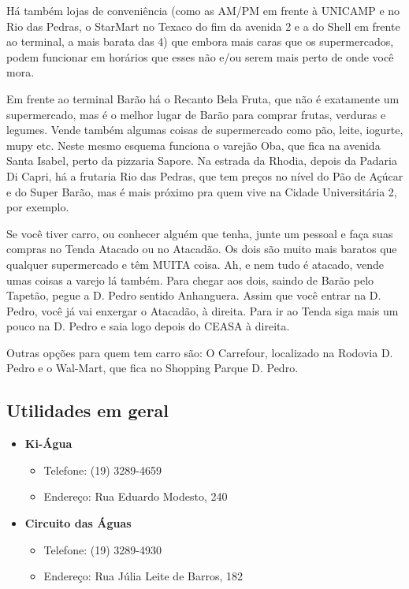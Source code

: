 \documentclass[a4paper,10pt]{article}
\begin{document}
Há também lojas de conveniência (como as AM/PM em frente à UNICAMP e no Rio das
Pedras, o StarMart no Texaco do fim da avenida 2 e a do Shell em frente ao
terminal, a mais barata das 4) que embora mais caras que os supermercados, podem
funcionar em horários que esses não e/ou serem mais perto de onde você mora.

Em frente ao terminal Barão há o Recanto Bela Fruta, que não é exatamente um
supermercado, mas é o melhor lugar de Barão para comprar frutas, verduras
e legumes. Vende também algumas coisas de supermercado como pão, leite, iogurte,
mupy etc. Neste mesmo esquema funciona o varejão Oba, que fica na avenida Santa
Isabel, perto da pizzaria Sapore. Na estrada da Rhodia, depois da Padaria Di
Capri, há a frutaria Rio das Pedras, que tem preços no nível do Pão de Açúcar
e do Super Barão, mas é mais próximo pra quem vive na Cidade Universitária 2,
por exemplo.

Se você tiver carro, ou conhecer alguém que tenha, junte um pessoal e faça suas
compras no Tenda Atacado ou no Atacadão. Os dois são muito mais baratos que
qualquer supermercado e têm MUITA coisa. Ah, e nem tudo é atacado, vende umas
coisas a varejo lá também. Para chegar aos dois, saindo de Barão pelo Tapetão,
pegue a D. Pedro sentido Anhanguera. Assim que você entrar na D. Pedro, você já
vai enxergar o Atacadão, à direita. Para ir ao Tenda siga mais um pouco na D.
Pedro e saia logo depois do CEASA à direita.

Outras opções para quem tem carro são: O Carrefour, localizado na Rodovia D.
Pedro e o Wal-Mart, que fica no Shopping Parque D. Pedro.

\subsection{Utilidades em geral}
\begin{itemize}
\item  \textbf{Ki-Água}
\begin{itemize}
\item  Telefone: (19) 3289-4659
\item  Endereço: Rua Eduardo Modesto, 240
\end{itemize}
\end{itemize}

\begin{itemize}
\item  \textbf{Circuito das Águas}
\begin{itemize}
\item  Telefone: (19) 3289-4930
\item  Endereço: Rua Júlia Leite de Barros, 182
\end{itemize}
\end{itemize}
\end{document}
